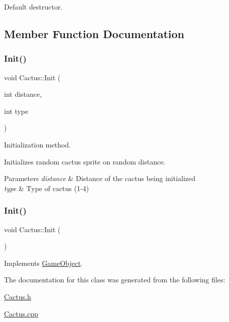 Default destructor. 



\subsection{Member Function Documentation}
\mbox{\label{class_cactus_a44cd240a41740db3216ce9d18ea9a8aa}} 
\subsubsection{\texorpdfstring{Init()}{Init()}\hspace{0.1cm}{\footnotesize\ttfamily [1/2]}}
{\footnotesize\ttfamily void Cactus\+::\+Init (\begin{DoxyParamCaption}\item[{int}]{distance,  }\item[{int}]{type }\end{DoxyParamCaption})}



Initialization method. 

Initializes random cactus sprite on random distance.


\begin{DoxyParams}{Parameters}
{\em distance} & Distance of the cactus being initialized \\
\hline
{\em type} & Type of cactus (1-\/4) \\
\hline
\end{DoxyParams}
\mbox{\label{class_cactus_af1dc82bd652141aea55d65bde708856a}} 
\subsubsection{\texorpdfstring{Init()}{Init()}\hspace{0.1cm}{\footnotesize\ttfamily [2/2]}}
{\footnotesize\ttfamily void Cactus\+::\+Init (\begin{DoxyParamCaption}{ }\end{DoxyParamCaption})\hspace{0.3cm}{\ttfamily [virtual]}}



Implements \mbox{\hyperlink{class_game_object_ab3b70fcc4e640ba2081508b1efb35536}{Game\+Object}}.



The documentation for this class was generated from the following files\+:\begin{DoxyCompactItemize}
\item 
\mbox{\hyperlink{_cactus_8h}{Cactus.\+h}}\item 
\mbox{\hyperlink{_cactus_8cpp}{Cactus.\+cpp}}\end{DoxyCompactItemize}
